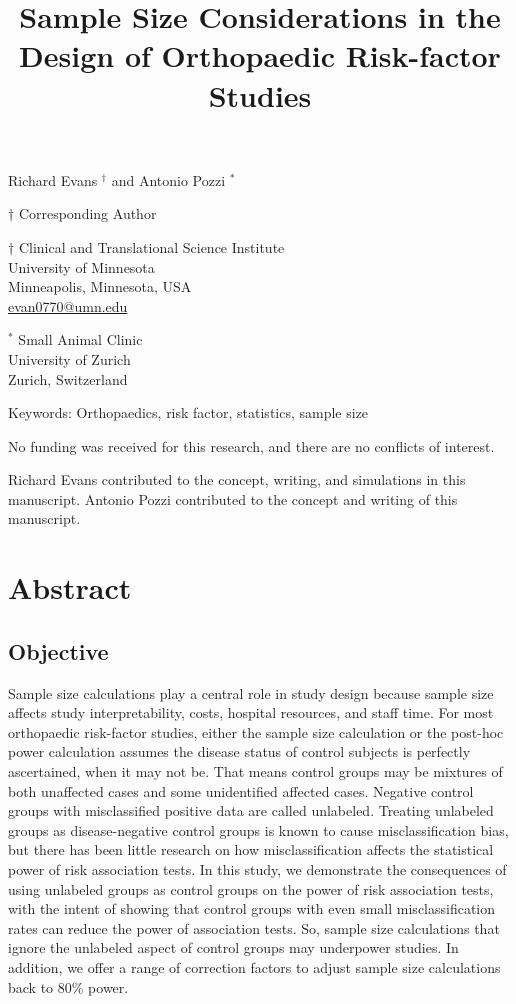 \documentclass[
]{article}
\title{\textbf{Sample Size Considerations in the Design of Orthopaedic
Risk-factor Studies}}
\author{}
\date{\vspace{-2.5em}}
\begin{document}
\maketitle

Richard Evans \({^\dagger}\) and Antonio Pozzi \({^*}\)

\({\dagger}\) Corresponding Author

\({\dagger}\) Clinical and Translational Science Institute\\
University of Minnesota\\
Minneapolis, Minnesota, USA\\
\href{mailto:evan0770@umn.edu}{evan0770@umn.edu}

\({^*}\) Small Animal Clinic\\
University of Zurich\\
Zurich, Switzerland

Keywords: Orthopaedics, risk factor, statistics, sample size

No funding was received for this research, and there are no conflicts of
interest.

Richard Evans contributed to the concept, writing, and simulations in
this manuscript. Antonio Pozzi contributed to the concept and writing of
this manuscript.

\newpage

\hypertarget{abstract}{%
\section{Abstract}\label{abstract}}

\hypertarget{objective}{%
\subsection{Objective}\label{objective}}

Sample size calculations play a central role in study design because
sample size affects study interpretability, costs, hospital resources,
and staff time. For most orthopaedic risk-factor studies, either the
sample size calculation or the post-hoc power calculation assumes the
disease status of control subjects is perfectly ascertained, when it may
not be. That means control groups may be mixtures of both unaffected
cases and some unidentified affected cases. Negative control groups with
misclassified positive data are called unlabeled. Treating unlabeled
groups as disease-negative control groups is known to cause
misclassification bias, but there has been little research on how
misclassification affects the statistical power of risk association
tests. In this study, we demonstrate the consequences of using unlabeled
groups as control groups on the power of risk association tests, with
the intent of showing that control groups with even small
misclassification rates can reduce the power of association tests. So,
sample size calculations that ignore the unlabeled aspect of control
groups may underpower studies. In addition, we offer a range of
correction factors to adjust sample size calculations back to 80\%
power.
\end{document}
